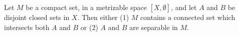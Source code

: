 Let $M$ be a compact set, in a metrizable space $[X, \emptyset]$, and let $A$ and $B$ be disjoint closed sets in $X$. Then either (1) $M$ contains a connected set which intersects both $A$ and $B$ or (2) $A$ and $B$ are separable in $M$.
